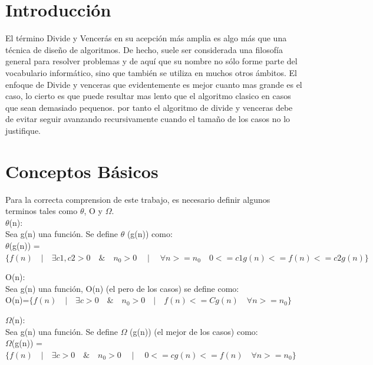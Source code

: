 \documentclass[spanish]{article}
\begin{document}
	\section{Introducci\'on}
	El término Divide y Vencerás en su acepción más amplia es algo más que una
	técnica de diseño de algoritmos. De hecho, suele ser considerada una filosofía
	general para resolver problemas y de aquí que su nombre no sólo forme parte del
	vocabulario informático, sino que también se utiliza en muchos otros ámbitos.
	El enfoque de Divide y venceras que evidentemente es mejor cuanto mas grande es el caso, lo cierto es que puede resultar mas lento que el algoritmo clasico en casos que sean 			demasiado pequenos. por tanto el algoritmo de divide y venceras debe de evitar seguir avanzando recursivamente cuando el tamaño de los casos no lo justifique.

\newpage
	\section{Conceptos B\'asicos}
	Para la correcta comprension de este trabajo, es necesario definir algunos terminos tales como $\theta$, O y $\Omega$.\\
	 $\theta$(n):\\
		Sea g(n) una función. Se define  $\theta$ (g(n)) como:\\
		
		 	$\theta$(g(n)) = $\{ f(n) \quad | \quad \exists c1,c2>0 \quad \& \quad n_{0}>0 \quad \mid \quad \forall n>=n_{0} \quad 0<= c1g(n) <= f(n) <= c2g(n) \}$
	\bigskip		 	
		 	
	O(n):\\
		Sea  g(n)  una función, O(n) (el pero de los casos) se define como:\\
		
			\hspace{1cm}O(n)=$\{f(n) \quad | \quad \exists c >0 \quad \& \quad n_{0}>0 \quad | \quad f(n) <= Cg(n) \quad \forall  n>= n_{0} \}$
	\bigskip
	
	$\Omega$(n):\\
	Sea  g(n)  una función. Se define $\Omega$ (g(n)) (el mejor de los casos) como:\\

		\hspace{1cm}$\Omega$(g(n)) =$\{f(n) \quad | \quad \exists c >0 \quad \& \quad n_{0}>0 \quad \mid \quad  0<= cg(n)<= f(n) \quad \forall n>= n_{0} \}$
	\bigskip
\end{document}
